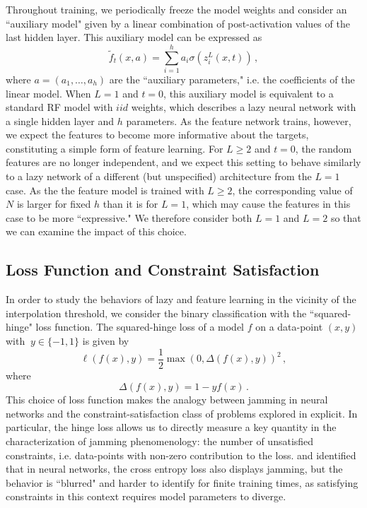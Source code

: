 \documentclass[11pt]{article}
\begin{document}
Throughout training, we periodically freeze the model weights and consider an ``auxiliary model" given by a linear combination of post-activation values of the last hidden layer. This auxiliary model can be expressed as
\begin{equation}
    \tilde f_t(x, a) = \sum_{i=1}^h a_i \sigma(z^L_i(x, t))\,,
    \label{auxiliary}
\end{equation}
where $a = (a_1, \ldots, a_h)$ are the ``auxiliary parameters," i.e. the coefficients of the linear model. When $L=1$ and $t=0$, this auxiliary model is equivalent to a standard RF model with $iid$ weights, which describes a lazy neural network with a single hidden layer and $h$ parameters. As the feature network trains, however, we expect the features to become more informative about the targets, constituting a simple form of feature learning. For $L\geq2$ and $t=0$, the random features are no longer independent, and we expect this setting to behave similarly to a lazy network of a different (but unspecified) architecture from the $L=1$ case. As the the feature model is trained with $L\geq2$, the corresponding value of $N$ is larger for fixed $h$ than it is for $L=1$, which may cause the features in this case to be more ``expressive." We therefore consider both $L=1$ and $L=2$ so that we can examine the impact of this choice.

\subsection{Loss Function and Constraint Satisfaction}

In order to study the behaviors of lazy and feature learning in the vicinity of the interpolation threshold, we consider the binary classification with the ``squared-hinge" loss function. The squared-hinge loss of a model $f$ on a data-point $(x,y)$ with  $\ y\in \{-1,1\}$ is given by
\begin{equation}
    \ell(f(x), y) = \frac{1}{2}\max(0, \Delta(f(x), y))^2\,,
    \label{hinge}
\end{equation}
where
\begin{equation}
    \Delta(f(x), y) = 1 - yf(x)\,.
\end{equation}
This choice of loss function makes the analogy between jamming in neural networks and the constraint-satisfaction class of problems explored in \cite{krzakalaLandscapeAnalysisConstraint2007} explicit. In particular, the hinge loss allows us to directly measure a key quantity in the characterization of jamming phenomenology: the number of unsatisfied constraints, i.e. data-points with non-zero contribution to the loss. \cite{geigerJammingTransitionParadigm2019} and \cite{spiglerJammingTransitionOverparametrization2019} identified that in neural networks, the cross entropy loss also displays jamming, but the behavior is ``blurred" and harder to identify for finite training times, as satisfying constraints in this context requires model parameters to diverge.\\
\end{document}
